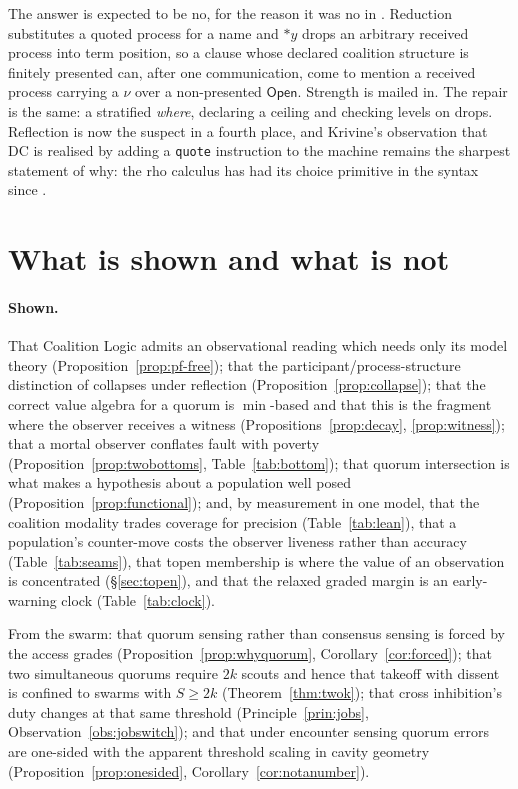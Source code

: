 \documentclass[11pt,a4paper]{article}
\theoremstyle{plain}
\theoremstyle{definition}
\theoremstyle{remark}
\newcommand{\Open}{\mathsf{Open}}
\begin{document}
The answer is expected to be no, for the reason it was no in \cite{choicef}.
Reduction substitutes a quoted process for a name and $*y$ drops an arbitrary
received process into term position, so a clause whose declared coalition
structure is finitely presented can, after one communication, come to mention a
received process carrying a $\nu$ over a non-presented $\Open$. Strength is
mailed in. The repair is the same: a stratified \emph{where}, declaring a
ceiling and checking levels on drops. Reflection is now the suspect in a fourth
place, and Krivine's observation that $\mathrm{DC}$ is realised by adding a
\texttt{quote} instruction to the machine remains the sharpest statement of why:
the rho calculus has had its choice primitive in the syntax since \cite{Mer05}.

\section{What is shown and what is not}\label{sec:shown}

\paragraph{Shown.} That Coalition Logic admits an observational reading which
needs only its model theory (Proposition~\ref{prop:pf-free}); that the
participant/process-structure distinction of \cite[\S7.1]{consensus} collapses
under reflection (Proposition~\ref{prop:collapse}); that the correct value
algebra for a quorum is $\min$-based and that this is the fragment where the
observer receives a witness (Propositions~\ref{prop:decay},
\ref{prop:witness}); that a mortal observer conflates fault with poverty
(Proposition~\ref{prop:twobottoms}, Table~\ref{tab:bottom}); that quorum
intersection is what makes a hypothesis about a population well posed
(Proposition~\ref{prop:functional}); and, by measurement in one model, that the
coalition modality trades coverage for precision (Table~\ref{tab:lean}), that a
population's counter-move costs the observer liveness rather than accuracy
(Table~\ref{tab:seams}), that topen membership is where the value of an
observation is concentrated (\S\ref{sec:topen}), and that the relaxed graded
margin is an early-warning clock (Table~\ref{tab:clock}).

From the swarm: that quorum sensing rather than consensus sensing is forced by
the access grades (Proposition~\ref{prop:whyquorum}, Corollary~\ref{cor:forced});
that two simultaneous quorums require $2k$ scouts and hence that takeoff with
dissent is confined to swarms with $S \ge 2k$ (Theorem~\ref{thm:twok}); that
cross inhibition's duty changes at that same threshold
(Principle~\ref{prin:jobs}, Observation~\ref{obs:jobswitch}); and that under
encounter sensing quorum errors are one-sided with the apparent threshold
scaling in cavity geometry (Proposition~\ref{prop:onesided},
Corollary~\ref{cor:notanumber}).
\end{document}
